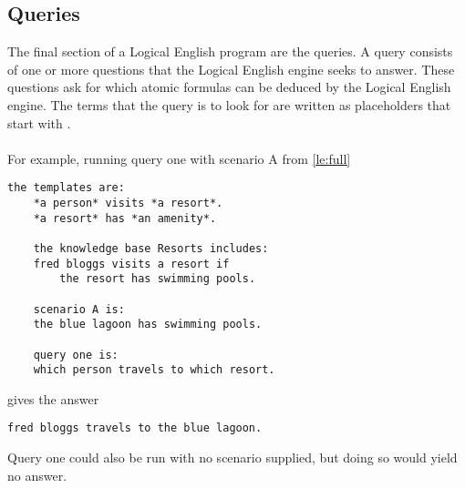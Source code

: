 \documentclass[../main.tex]{subfiles}
\begin{document}
\subsection{Queries}
The final section of a Logical English program are the queries. A query consists of one or more questions that the Logical English engine seeks to answer. These questions ask for which atomic formulas can be deduced by the Logical English engine. The terms that the query is to look for are written as placeholders that start with . 
\\
\\
For example, running query one with scenario A from \ref{le:full}
\begin{lstlisting}[language={LE},label={le:full},caption={Another short Logical English program.}]
    the templates are:
    *a person* visits *a resort*.
    *a resort* has *an amenity*.

    the knowledge base Resorts includes:
    fred bloggs visits a resort if
        the resort has swimming pools.

    scenario A is:
    the blue lagoon has swimming pools.

    query one is:
    which person travels to which resort.
\end{lstlisting}
gives the answer
\begin{lstlisting}[language={LE}]
    fred bloggs travels to the blue lagoon.
\end{lstlisting}
Query one could also be run with no scenario supplied, but doing so would yield no answer.
\end{document}
